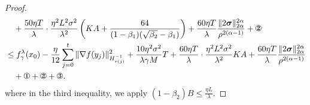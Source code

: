 \documentclass{article} %
\numberwithin{equation}{section}
\newcommand{\cirone}{\text{\ding{172}}}
\newcommand{\cirtwo}{\text{\ding{173}}}
\newcommand{\cirthree}{\text{\ding{174}}}
\begin{document}
\begin{proof}
\begin{equation}
\begin{aligned}
            &\quad + \frac{50\eta T}{\lambda}\cdot \frac{\eta^2L^2\sigma^2}{\lambda^2}\left(KA+\frac{64}{(1-\beta_1)(\sqrt{\beta_2}-\beta_1)}\right) + \frac{60\eta T}{\lambda} \frac{\|2\boldsymbol{\sigma}\|_{2\alpha}^{2\alpha}}{\rho^{2(\alpha-1)}} +\cirtwo\\
            &\leq f_\gamma^{\lambda}(x_0) - \frac{\eta}{12} \sum_{j=0}^t\|\nabla f(y_j)\|_{H_{r(j)}^{-1}}^2 + \frac{10\eta^2\sigma^2}{\lambda\gamma M}T + \frac{60\eta T}{\lambda}\cdot \frac{\eta^2L^2\sigma^2}{\lambda^2}KA + \frac{60\eta T}{\lambda} \frac{\|2\boldsymbol{\sigma}\|_{2\alpha}^{2\alpha}}{\rho^{2(\alpha-1)}}\\
            &\quad + \cirone + \cirtwo + \cirthree.
        \end{aligned}
    \end{equation}
    where in the third inequality, we apply $(1-\beta_2)B\leq \frac{\eta L}{\lambda}$.
    

\end{proof}
\end{document}
